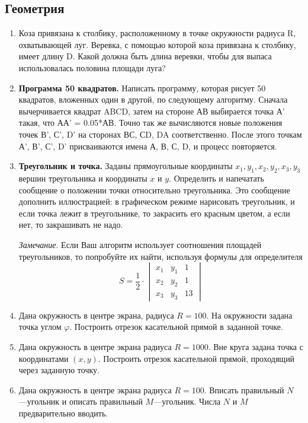 \subsection{Геометрия}

\begin{enumerate}
  \item Коза привязана к столбику, расположенному в точке окружности радиуса R, охватывающей луг. Веревка, с помощью которой коза привязана к столбику, имеет длину D. 
Какой должна быть длина веревки, чтобы для выпаса использовалась половина площади луга?


  \item {\bf Программа 50 квадратов.} Написать программу, которая рисует 50 квадратов, вложенных один в другой, по следующему алгоритму. Сначала вычерчивается квадрат ABCD, затем на стороне АВ выбирается точка А' такая, что АА' = 0.05*АВ. Точно так же вычисляются новые положения точек В', С', D' на сторонах ВС, СD, DA соответственно. После этого точкам А', В', С', D' присваиваются имена А, В, С, D, и процесс повторяется.

  \item {\bf Треугольник и точка.} 
Заданы   прямоугольные координаты $x_1, y_1,x_2,y_2,x_3,y_3$ вершин треугольника и координаты $x$ и $y$. Определить и напечатать сообщение о положении точки относительно треугольника. Это сообщение дополнить иллюстрацией: в графическом режиме нарисовать треугольник, и если точка лежит в треугольнике, то закрасить его красным цветом, а если нет, то закрашивать не надо.

{\em Замечание}.   Если Ваш алгоритм использует соотношения площадей треугольников, то попробуйте их найти, используя формулы для определителя
$$S = \frac{1}{2} 
\cdot\begin{vmatrix} 
    x_1 & y_1 & 1\\
    x_2 & y_2 & 1\\
    x_3 & y_3 & 13
\end{vmatrix}
$$

  \item Дана окружность в центре экрана, радиуса $R=100$.  На окружности задана точка углом $\varphi$. Построить отрезок касательной прямой в заданной точке.

  \item Дана окружность в центре экрана радиуса $R=100$0. Вне круга задана точка с координатами $(x,y)$. Построить отрезок касательной прямой, проходящий через заданную точку.

  \item Дана окружность в центре экрана радиуса $R=100$. Вписать правильный $N$ ---угольник и описать правильный $M$---угольник. Числа $N$ и $M$ предварительно вводить.


\end{enumerate}
